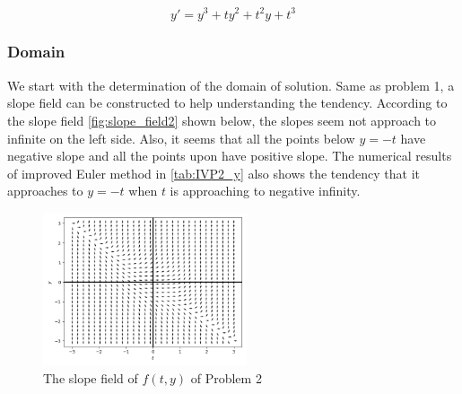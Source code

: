 \documentclass[a4paper]{article}
\begin{document}
	\begin{equation} \label{eq:ode2}
		y' = y^3 + ty^2 + t^2y + t^3 \tag{ODE2}
	\end{equation}
	
	\subsubsection{Domain}
	
	We start with the determination of the domain of solution. Same as problem 1, a slope field can be constructed to help understanding the tendency. According to the slope field \autoref{fig:slope_field2} shown below, the slopes seem not approach to infinite on the left side. Also, it seems that all the points below $y= -t$ have negative slope and all the points upon have positive slope. The numerical results of improved Euler method in \autoref{tab:IVP2_y} also shows the tendency that it approaches to $y = -t$ when $t$ is approaching to negative infinity. 
	
	\begin{figure}[H]
		\centering
		\includegraphics[width=6cm]{img/slope_field2.png}
		\caption{\label{fig:slope_field2} The slope field of $f(t, y)$ of Problem 2}
	\end{figure}
	
	\begin{table}[H]
		\centering
		\caption{Using Four Euler Method to Compute y Value}
		\label{tab:IVP2_y}
	\end{table}
	
\end{document}
